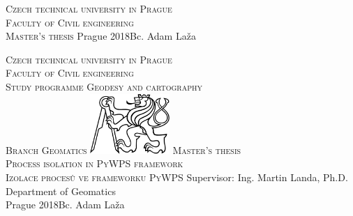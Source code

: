 \begin{center}
\newcommand{\napisCVUT}{Czech technical university in Prague}
\newcommand{\napisFS}{Faculty of Civil engineering}
\newcommand{\napisProgram}{Study programme Geodesy and cartography}
\newcommand{\napisObor}{Branch Geomatics}
\newcommand{\napisKatedra}{Department of Geomatics}
\newcommand{\napisVedouci}{Supervisor: Ing. Martin Landa, Ph.D.}
\newcommand{\napisAutor}{Bc. Adam Laža}
\newcommand{\napisDatum}{Prague 2018}
\newcommand{\napisNazevI}{Process isolation in PyWPS framework}
\newcommand{\napisNazevAjI}{Izolace procesů ve frameworku PyWPS}
\newcommand{\napisDiplomka}{Master's thesis}
\newcommand{\napisPraha}{Prague 2018}
%
\newcommand{\velka}[1]{\textsc{#1}}
%
% 
\newif\ifpatitul
\patitultrue

\ifpatitul
{\Large\velka{\napisCVUT}}\\
\velka{\Large\napisFS}\\
\vfill
{\LARGE\velka{\napisDiplomka}}
\vfill
{\large\napisPraha\hfill\napisAutor}
\newpage
\fi%


{\Large\velka{\napisCVUT}}\\
{\Large\velka{\napisFS}}\\
{\Large\velka{\napisProgram}}\\
{\Large\velka{\napisObor}}
\vfill
\includegraphics[width=3cm]{logo_cvut_cb} %
\vfill
{\Large\velka{\napisDiplomka}}\\
\Large\velka{\napisNazevI}\\
\large\velka{\napisNazevAjI}
\vfill
{\large%
\napisVedouci\\
\napisKatedra\\
\bigskip
\napisDatum\hfill\napisAutor}
\end{center}
